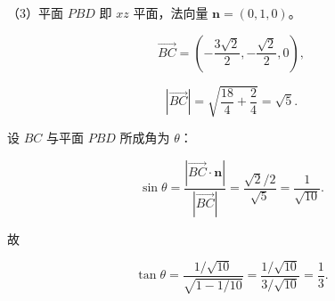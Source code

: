 \begin{answer}
（3）平面 $PBD$ 即 $xz$ 平面，法向量 $\mathbf n=(0,1,0)$。

\nopagebreak[4]
\[\overrightarrow{BC}=\left(-\frac{3\sqrt2}{2},-\frac{\sqrt2}{2},0\right),\]

\nopagebreak[4]
\[|\overrightarrow{BC}|=\sqrt{\frac{18}{4}+\frac{2}{4}}=\sqrt5 .\]

设 $BC$ 与平面 $PBD$ 所成角为 $\theta$：

\nopagebreak[4]
\[\sin\theta=\frac{|\overrightarrow{BC}\cdot\mathbf n|}{|\overrightarrow{BC}|}
=\frac{\sqrt2/2}{\sqrt5}=\frac{1}{\sqrt{10}} .\]

故

\nopagebreak[4]
\[\tan\theta=\frac{1/\sqrt{10}}{\sqrt{1-1/10}}=\frac{1/\sqrt{10}}{3/\sqrt{10}}=\frac13 .\]


\end{answer}
